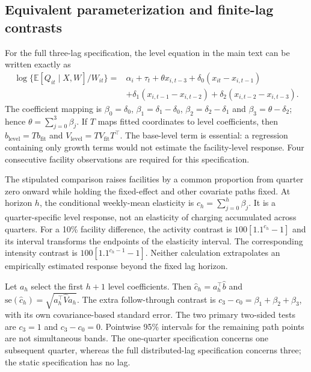 \subsection{Equivalent parameterization and finite-lag contrasts}
For the full three-lag specification, the level equation in the main text can
be written exactly as
\begin{align}
 \log\{\mathbb E[Q_{it}\mid X,W]/W_{it}\}
 ={}&\alpha_i+\tau_t+\theta x_{i,t-3}
 +\delta_0(x_{it}-x_{i,t-1})\\
 &+\delta_1(x_{i,t-1}-x_{i,t-2})
 +\delta_2(x_{i,t-2}-x_{i,t-3}).
\end{align}
The coefficient mapping is
$\beta_0=\delta_0$, $\beta_1=\delta_1-\delta_0$,
$\beta_2=\delta_2-\delta_1$ and $\beta_3=\theta-\delta_2$; hence
$\theta=\sum_{j=0}^3\beta_j$.  If $T$ maps fitted coordinates to level
coefficients, then $b_{\mathrm{level}}=Tb_{\mathrm{fit}}$ and
$V_{\mathrm{level}}=TV_{\mathrm{fit}}T^{\top}$.  The base-level term is
essential: a regression containing only growth terms would not estimate the
facility-level response.  Four consecutive facility observations are required
for this specification.

The stipulated comparison raises facilities by a common proportion from
quarter zero onward while holding the fixed-effect and other covariate paths
fixed.  At horizon $h$, the conditional weekly-mean elasticity is
$c_h=\sum_{j=0}^h\beta_j$.  It is a quarter-specific level response, not an
elasticity of charging accumulated across quarters.  For a 10\% facility
difference, the activity contrast is
$100[1.1^{c_h}-1]$ and its interval transforms the endpoints of the elasticity
interval.  The corresponding intensity contrast is
$100[1.1^{c_h-1}-1]$.  Neither calculation extrapolates an empirically estimated
response beyond the fixed lag horizon.

Let $a_h$ select the first $h+1$ level coefficients.  Then
$\widehat c_h=a_h^{\top}\widehat b$ and
$\mathrm{se}(\widehat c_h)=\sqrt{a_h^{\top}\widehat V a_h}$.  The extra
follow-through contrast is $c_3-c_0=\beta_1+\beta_2+\beta_3$, with its own
covariance-based standard error.  The two primary two-sided tests are
$c_3=1$ and $c_3-c_0=0$.  Pointwise 95\% intervals for the remaining path
points are not simultaneous bands.  The one-quarter specification concerns one
subsequent quarter, whereas the full distributed-lag specification concerns
three; the static specification has no lag.

